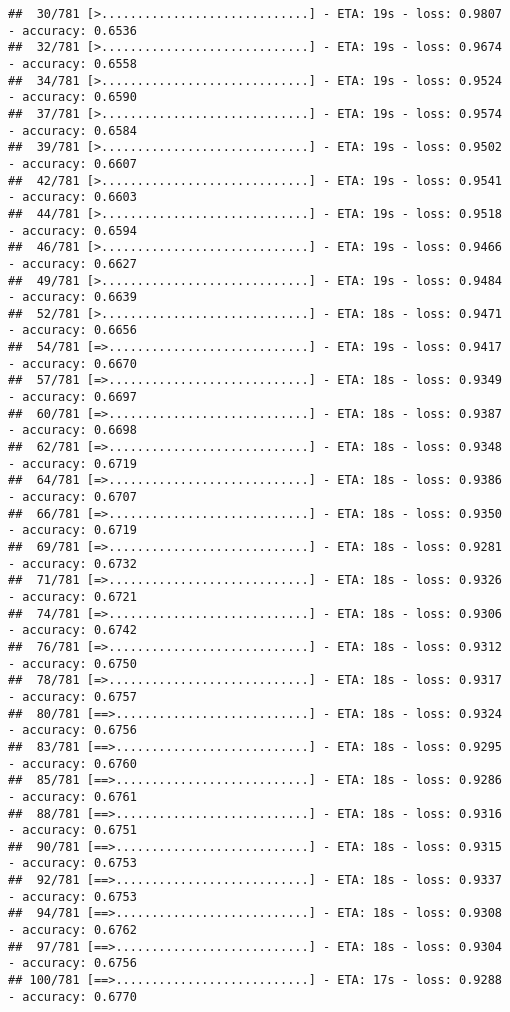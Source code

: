 \documentclass[
]{article}
\begin{document}
\begin{verbatim}
##  30/781 [>.............................] - ETA: 19s - loss: 0.9807 - accuracy: 0.6536
##  32/781 [>.............................] - ETA: 19s - loss: 0.9674 - accuracy: 0.6558
##  34/781 [>.............................] - ETA: 19s - loss: 0.9524 - accuracy: 0.6590
##  37/781 [>.............................] - ETA: 19s - loss: 0.9574 - accuracy: 0.6584
##  39/781 [>.............................] - ETA: 19s - loss: 0.9502 - accuracy: 0.6607
##  42/781 [>.............................] - ETA: 19s - loss: 0.9541 - accuracy: 0.6603
##  44/781 [>.............................] - ETA: 19s - loss: 0.9518 - accuracy: 0.6594
##  46/781 [>.............................] - ETA: 19s - loss: 0.9466 - accuracy: 0.6627
##  49/781 [>.............................] - ETA: 19s - loss: 0.9484 - accuracy: 0.6639
##  52/781 [>.............................] - ETA: 18s - loss: 0.9471 - accuracy: 0.6656
##  54/781 [=>............................] - ETA: 19s - loss: 0.9417 - accuracy: 0.6670
##  57/781 [=>............................] - ETA: 18s - loss: 0.9349 - accuracy: 0.6697
##  60/781 [=>............................] - ETA: 18s - loss: 0.9387 - accuracy: 0.6698
##  62/781 [=>............................] - ETA: 18s - loss: 0.9348 - accuracy: 0.6719
##  64/781 [=>............................] - ETA: 18s - loss: 0.9386 - accuracy: 0.6707
##  66/781 [=>............................] - ETA: 18s - loss: 0.9350 - accuracy: 0.6719
##  69/781 [=>............................] - ETA: 18s - loss: 0.9281 - accuracy: 0.6732
##  71/781 [=>............................] - ETA: 18s - loss: 0.9326 - accuracy: 0.6721
##  74/781 [=>............................] - ETA: 18s - loss: 0.9306 - accuracy: 0.6742
##  76/781 [=>............................] - ETA: 18s - loss: 0.9312 - accuracy: 0.6750
##  78/781 [=>............................] - ETA: 18s - loss: 0.9317 - accuracy: 0.6757
##  80/781 [==>...........................] - ETA: 18s - loss: 0.9324 - accuracy: 0.6756
##  83/781 [==>...........................] - ETA: 18s - loss: 0.9295 - accuracy: 0.6760
##  85/781 [==>...........................] - ETA: 18s - loss: 0.9286 - accuracy: 0.6761
##  88/781 [==>...........................] - ETA: 18s - loss: 0.9316 - accuracy: 0.6751
##  90/781 [==>...........................] - ETA: 18s - loss: 0.9315 - accuracy: 0.6753
##  92/781 [==>...........................] - ETA: 18s - loss: 0.9337 - accuracy: 0.6753
##  94/781 [==>...........................] - ETA: 18s - loss: 0.9308 - accuracy: 0.6762
##  97/781 [==>...........................] - ETA: 18s - loss: 0.9304 - accuracy: 0.6756
## 100/781 [==>...........................] - ETA: 17s - loss: 0.9288 - accuracy: 0.6770

\end{verbatim}
\end{document}
